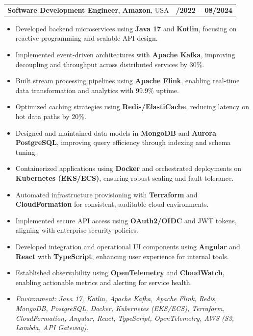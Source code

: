 \documentclass[letterpaper,11pt]{article}
\makeatletter
\newcommand{\resumeItem}[1]{
  \item\footnotesize{
    {#1 \vspace{-2pt}}
  }
}
\newcommand{\resumeSubheading}[4]{
  \vspace{-2pt}\item
    \begin{tabular*}{1.0\textwidth}[t]{l@{\extracolsep{\fill}}r}
      \textbf{\fontsize{10pt}{14pt}\selectfont #3}, \textbf{\fontsize{10pt}{14pt}\selectfont #1}, \fontsize{10pt}{14pt}\selectfont #4 & \textbf{\fontsize{10pt}{14pt}\selectfont #2} \\
    \end{tabular*}\vspace{-7pt}
}
\newcommand{\resumeItemListStart}{\begin{itemize}[leftmargin=*]}
\newcommand{\resumeItemListEnd}{\end{itemize}\vspace{-5pt}}
\makeatother
\begin{document}
\resumeSubheading
{Amazon}{10/2022 -- 08/2024}
{Software Development Engineer}{USA}
\resumeItemListStart
  \resumeItem{Developed backend microservices using \textbf{Java 17} and \textbf{Kotlin}, focusing on reactive programming and scalable API design.}
  \resumeItem{Implemented event-driven architectures with \textbf{Apache Kafka}, improving decoupling and throughput across distributed services by 30\%.}
  \resumeItem{Built stream processing pipelines using \textbf{Apache Flink}, enabling real-time data transformation and analytics with 99.9\% uptime.}
  \resumeItem{Optimized caching strategies using \textbf{Redis/ElastiCache}, reducing latency on hot data paths by 20\%.}
  \resumeItem{Designed and maintained data models in \textbf{MongoDB} and \textbf{Aurora PostgreSQL}, improving query efficiency through indexing and schema tuning.}
  \resumeItem{Containerized applications using \textbf{Docker} and orchestrated deployments on \textbf{Kubernetes (EKS/ECS)}, ensuring robust scaling and fault tolerance.}
  \resumeItem{Automated infrastructure provisioning with \textbf{Terraform} and \textbf{CloudFormation} for consistent, auditable cloud environments.}
  \resumeItem{Implemented secure API access using \textbf{OAuth2/OIDC} and JWT tokens, aligning with enterprise security policies.}
  \resumeItem{Developed integration and operational UI components using \textbf{Angular} and \textbf{React} with \textbf{TypeScript}, enhancing user experience for internal tools.}
  \resumeItem{Established observability using \textbf{OpenTelemetry} and \textbf{CloudWatch}, enabling actionable metrics and alerting for service health.}
  \resumeItem{\textit{Environment: Java 17, Kotlin, Apache Kafka, Apache Flink, Redis, MongoDB, PostgreSQL, Docker, Kubernetes (EKS/ECS), Terraform, CloudFormation, Angular, React, TypeScript, OpenTelemetry, AWS (S3, Lambda, API Gateway).}}
\resumeItemListEnd
\end{document}
